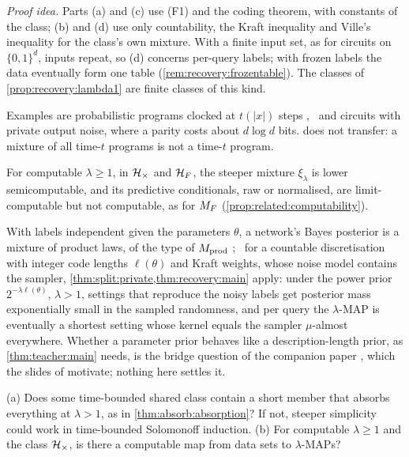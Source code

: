 \emph{Proof idea.} Parts (a) and (c) use (F1) and the coding theorem, with constants of the class; (b) and (d) use only countability, the Kraft inequality and Ville's inequality for the class's own mixture. With a finite input set, as for circuits on $\{0,1\}^d$, inputs repeat, so (d) concerns per-query labels; with frozen labels the data eventually form one table (\cref{rem:recovery:frozentable}). The classes of \cref{prop:recovery:lambda1} are finite classes of this kind.

\begin{remark}[Examples]\label{rem:computable:examples}
Examples are probabilistic programs clocked at $t(|x|)$ steps \citep[Section~9.1]{claudeSFI2026fundamentals},%
\ and circuits with private output noise, where a parity costs about $d\log d$ bits.  does not transfer: a mixture of all time-$t$ programs is not a time-$t$ program.
\end{remark}

For computable $\lambda\ge1$, in $\mathcal{H}_{\times}$ and $\mathcal{H}_{F}$, the steeper mixture $\xi_\lambda$ is lower semicomputable, and its predictive conditionals, raw or normalised, are limit-computable but not computable, as for $M_{F}$ (\cref{prop:related:computability}).

\begin{remark}\label{rem:related:nn}
With labels independent given the parameters $\theta$, a network's Bayes posterior is a mixture of product laws, of the type of $M_{\mathrm{prod}}$ \citep[Proposition~10.1]{claudeSFI2026fundamentals};%
\ for a countable discretisation with integer code lengths $\ell(\theta)$ and Kraft weights, whose noise model contains the sampler, \cref{thm:split:private,thm:recovery:main} apply: under the power prior $2^{-\lambda\ell(\theta)}$, $\lambda>1$, settings that reproduce the noisy labels get posterior mass exponentially small in the sampled randomness, and per query the $\lambda$-MAP is eventually a shortest setting whose kernel equals the sampler $\mu$-almost everywhere. Whether a parameter prior behaves like a description-length prior, as \cref{thm:teacher:main} needs, is the bridge question of the companion paper \citep[Question~10.9 and Remark~H.2]{claudeSFI2026fundamentals}, which the slides of \citet{vaintrobhanni2026nnbayes} motivate; nothing here settles it.%
\end{remark}

\begin{question}\label{q:related:open}
(a) Does some time-bounded shared class contain a short member that absorbs everything at $\lambda>1$, as in \cref{thm:absorb:absorption}? If not, steeper simplicity could work in time-bounded Solomonoff induction. (b) For computable $\lambda\ge1$ and the class $\mathcal{H}_{\times}$, is there a computable map from data sets to $\lambda$-MAPs?
\end{question}
